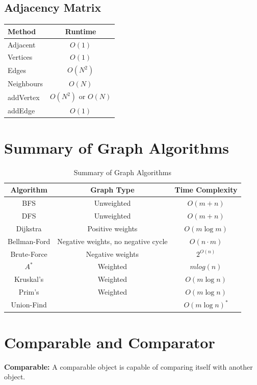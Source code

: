 \documentclass{article}
\begin{document}
\subsection{Adjacency Matrix}
\begin{table}[!ht]
\centering
\begin{tabular}{|l|c|}
\hline
\textbf{Method} & \textbf{Runtime} \\
\hline
Adjacent & $O(1)$ \\
\hline
Vertices & $O(1)$ \\
\hline
Edges & $O(N^2)$ \\
\hline
Neighbours & $O(N)$ \\
\hline 
addVertex & $O(N^2)$ or $O(N)$ \\
\hline
addEdge & $O(1)$ \\
\hline
\end{tabular}
\end{table}


\section{Summary of Graph Algorithms}
\begin{table}[!ht]
\centering
\begin{tabular}{|c|c|c|}
\hline
\textbf{Algorithm} & \textbf{Graph Type} & \textbf{Time Complexity} \\
\hline
BFS & Unweighted & \( O(m + n) \) \\
\hline
DFS & Unweighted & \( O(m + n) \)\\
\hline
Dijkstra & Positive weights & \( O(m \log m) \) \\
\hline
Bellman-Ford & Negative weights, no negative cycle & \( O(n \cdot m) \) \\
\hline
Brute-Force & Negative weights & \( 2^{O(n)} \) \\
\hline
$A^*$ &Weighted& $mlog( n )$ \\
\hline
Kruskal's &Weighted& \( O(m \log n) \) \\
\hline
Prim's  &Weighted& \( O(m \log n) \) \\
\hline
Union-Find  && \( O(m \log n)^* \) \\
\hline
\end{tabular}
\caption{Summary of Graph Algorithms}
\end{table}

\section{Comparable and Comparator}
\textbf{Comparable:}
A comparable object is capable of comparing itself with another object.
\end{document}

